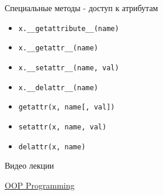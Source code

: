 \documentclass{article}
\begin{document}
\begin{center} Специальные методы - доступ к атрибутам \end{center}
\begin{itemize}
    \item \lstinline!x.__getattribute__(name)!
    \item \lstinline!x.__getattr__(name)!
    \item \lstinline!x.__setattr__(name, val)!
    \item \lstinline!x.__delattr__(name)!
    \item \lstinline!getattr(x, name[, val])!
    \item \lstinline!setattr(x, name, val)!
    \item \lstinline!delattr(x, name)!
\end{itemize}
\newpage

\begin{center} Видео лекции \end{center}
	\href{http://www.youtube.com/watch?v=rDXuPBjVfSc&feature=related}{OOP Programming}
\newpage
\end{document}
